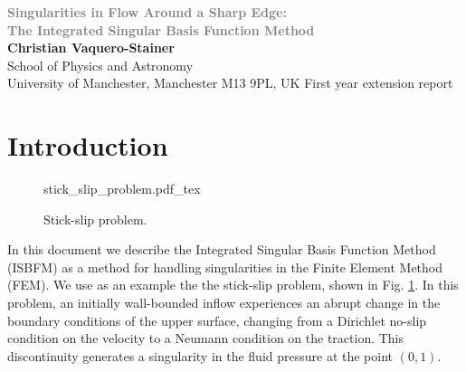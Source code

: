 \documentclass[12pt,a4paper]{article}
\title{}
\author{Student No: 10239339} %
\date{}
\numberwithin{equation}{section}
\begin{document}
%
\begin{titlepage}
    \begin{center}
        \vspace*{1cm}        
        \Huge
        \textcolor{gray}{\textbf{Singularities in Flow Around a Sharp Edge: \\ \Large The Integrated Singular Basis Function Method}}
        \vspace{1.5cm}        \\
        \large\textbf{Christian Vaquero-Stainer} \\ \vspace{4mm} 
        \normalsize
        School of Physics and Astronomy \\
        University of Manchester, Manchester M13 9PL, UK
        \vfill
        \normalsize
        First year extension report
    \vfill
    \end{center}
\end{titlepage}
\restoregeometry
{}
%
\section{Introduction}  
\begin{figure}
  {stick_slip_problem.pdf_tex}
  \vspace{5mm}
  \caption{Stick-slip problem.}
  \label{fig:stick_slip}
\end{figure}
In this document we describe the Integrated Singular Basis Function Method (ISBFM) as a method for handling singularities in the Finite Element Method (FEM). We use as an example the the stick-slip problem, shown in Fig. \ref{fig:stick_slip}. In this problem, an initially wall-bounded inflow experiences an abrupt change in the boundary conditions of the upper surface, changing from a Dirichlet no-slip condition on the velocity to a Neumann condition on the traction. This discontinuity generates a singularity in the fluid pressure  at the point $(0,1)$.
\end{document}
